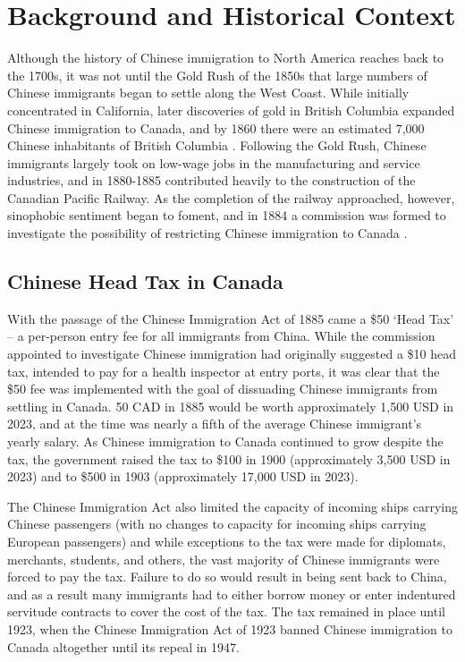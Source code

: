 \documentclass[12pt]{article}
\begin{document}
\section{Background and Historical Context}
Although the history of Chinese immigration to North America reaches back to the 1700s, it was not until the Gold Rush of the 1850s that large numbers of Chinese immigrants began to settle along the West Coast. 
While initially concentrated in California, later discoveries of gold in British Columbia expanded Chinese immigration to Canada, and by 1860 there were an estimated 7,000 Chinese inhabitants of British Columbia \citep{chan2019}.
Following the Gold Rush, Chinese immigrants largely took on low-wage jobs in the manufacturing and service industries, and in 1880-1885 contributed heavily to the construction of the Canadian Pacific Railway.
As the completion of the railway approached, however, sinophobic sentiment began to foment, and in 1884 a commission was formed to investigate the possibility of restricting Chinese immigration to Canada \citep{chan2016}.

\subsection{Chinese Head Tax in Canada}
With the passage of the Chinese Immigration Act of 1885 came a \$50 `Head Tax' -- a per-person entry fee for all immigrants from China. While the commission appointed to investigate Chinese immigration had originally suggested a \$10 head tax, intended to pay for a health inspector at entry ports,
it was clear that the \$50 fee was implemented with the goal of dissuading Chinese immigrants from settling in Canada. 50 CAD in 1885 would be worth approximately 1,500 USD in 2023, and at the time was nearly a fifth of the average Chinese immigrant's yearly salary.
As Chinese immigration to Canada continued to grow despite the tax, the government raised the tax to \$100 in 1900 (approximately 3,500 USD in 2023) and to \$500 in 1903 (approximately 17,000 USD in 2023). 

The Chinese Immigration Act also limited the capacity of incoming ships carrying Chinese passengers (with no changes to capacity for incoming ships carrying European passengers) and while exceptions to the tax were made for diplomats, merchants, students, and others, the vast majority of Chinese immigrants were forced to pay the tax. 
Failure to do so would result in being sent back to China, and as a result many immigrants had to either borrow money or enter indentured servitude contracts to cover the cost of the tax. 
The tax remained in place until 1923, when the Chinese Immigration Act of 1923 banned Chinese immigration to Canada altogether until its repeal in 1947.
\end{document}
